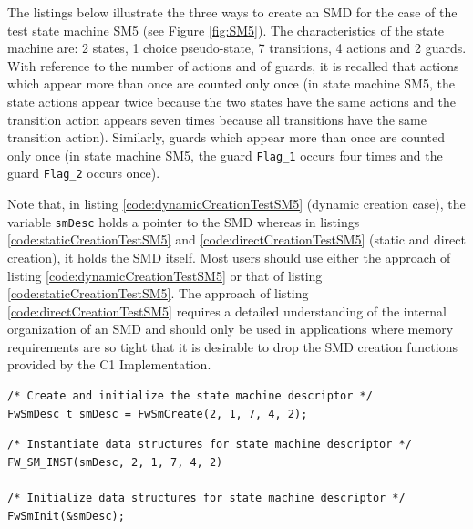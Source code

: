 \documentclass[manual]{../fwprofile}
\begin{document}
\newpage

The listings below illustrate the three ways to create an SMD for the case of the test state machine SM5 
(see Figure \ref{fig:SM5}). The characteristics of the state machine are: 2 states, 1 choice pseudo-state, 
7 transitions, 4 actions and 2 guards. With reference to the number of actions and of guards, it is recalled 
that actions which appear more than once are counted only once (in state machine SM5, the state actions appear 
twice because the two states have the same actions and the transition action appears seven times because all 
transitions have the same transition action). Similarly, guards which appear more than once are counted only 
once (in state machine SM5, the guard \texttt{Flag\_1} occurs four times and the guard \texttt{Flag\_2} occurs once).

Note that, in listing \ref{code:dynamicCreationTestSM5} (dynamic creation case), the variable \texttt{smDesc} holds a pointer to the SMD 
whereas in listings \ref{code:staticCreationTestSM5} and \ref{code:directCreationTestSM5} 
(static and direct creation), it holds the SMD itself. Most users should 
use either the approach of listing \ref{code:dynamicCreationTestSM5} or that of listing \ref{code:staticCreationTestSM5}. 
The approach of listing \ref{code:directCreationTestSM5} requires a detailed 
understanding of the internal organization of an SMD and should only be used in applications where memory 
requirements are so tight that it is desirable to drop the SMD creation functions provided by the C1 Implementation.

\begin{lstlisting}
/* Create and initialize the state machine descriptor */
FwSmDesc_t smDesc = FwSmCreate(2, 1, 7, 4, 2);
\end{lstlisting}

\begin{lstlisting}
/* Instantiate data structures for state machine descriptor */
FW_SM_INST(smDesc, 2, 1, 7, 4, 2)

/* Initialize data structures for state machine descriptor */
FwSmInit(&smDesc);
\end{lstlisting}
\end{document}
